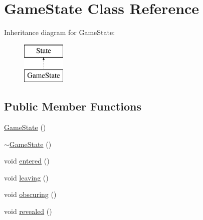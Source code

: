 \hypertarget{class_game_state}{\section{Game\+State Class Reference}
\label{class_game_state}
}
Inheritance diagram for Game\+State\+:\begin{figure}[H]
\begin{center}
\leavevmode
\includegraphics[height=2.000000cm]{class_game_state}
\end{center}
\end{figure}
\subsection*{Public Member Functions}
\begin{DoxyCompactItemize}
\item 
\hyperlink{class_game_state_a4fa0a2bf50315c4a35a3890a0adcee5c}{Game\+State} ()
\item 
\hyperlink{class_game_state_ae623df5042cd0c17daa3394fdcb397b3}{$\sim$\+Game\+State} ()
\item 
void \hyperlink{class_game_state_a74ff91dece6aea2f96ad9e4980b1d08d}{entered} ()
\item 
void \hyperlink{class_game_state_a604127103f564a3ab1ba6b75ecf5e19a}{leaving} ()
\item 
void \hyperlink{class_game_state_aa64650e6a0d7db95d014135929351e7c}{obscuring} ()
\item 
void \hyperlink{class_game_state_a5d616fb3ecae1e94da4db55eae806cfb}{revealed} ()
\end{DoxyCompactItemize}



